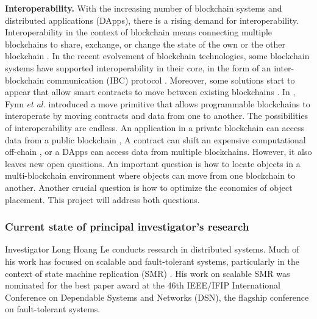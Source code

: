 \textbf{Interoperability.} With the increasing number of blockchain systems
and distributed applications (DApps), there is a rising demand for
interoperability. Interoperability in the context of blockchain means connecting
multiple blockchains to share, exchange, or change the state of the own or the
other blockchain \cite{buterin2016chain}. In the recent evolvement of blockchain
technologies, some blockchain systems have supported interoperability in their
core, in the form of an inter-blockchain communication (IBC) protocol
\cite{kwon2016cosmos, thomas2015protocol, kokoris2018omniledger,
al2017chainspace}. Moreover, some solutions start to appear that allow smart
contracts to move between existing blockchains \cite{fynn2020move,
back2014enabling, herlihy2018atomic}. In \cite{fynn2020move}, Fynn \emph{et al.}
introduced a move primitive \cite{fynn2020move} that allows programmable blockchains
to interoperate by moving contracts and data from one to another. The
possibilities of interoperability are endless. An application in a private
blockchain can access data from a public blockchain \cite{prusty2018blockchain},
A contract can shift an expensive computational off-chain
\cite{teutsch2019scalable, network2018cheap}, or a DApps can access data from
multiple blockchains. However, it also leaves new open questions. An important question is
how to locate objects in a multi-blockchain environment where objects can move from one
blockchain to another.
Another crucial question is how to optimize the economics of object placement.
This project will address both questions.

\subsubsection{Current state of principal investigator's research}

Investigator Long Hoang Le conducts research in distributed systems. Much of his
work has focused on scalable and fault-tolerant systems, particularly in the context of
state machine replication (SMR) \cite{le2016dssmr, le2019dynastar, bezerra2016strong}.
His work on scalable SMR \cite{le2016dssmr} was nominated for the best paper award at 
the 46th IEEE/IFIP International Conference on Dependable Systems and Networks (DSN),
the flagship conference on fault-tolerant systems.

